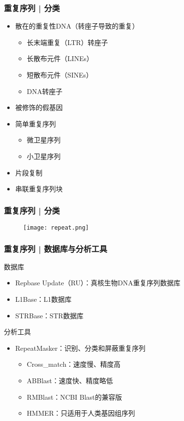 \begin{frame}
  \frametitle{重复序列 | 分类}
  \begin{itemize}
    \item 散在的重复性DNA（转座子导致的重复）
      \begin{itemize}
	\item 长末端重复（LTR）转座子
	\item 长散布元件（LINEs）
	\item 短散布元件（SINEs）
	\item DNA转座子
      \end{itemize}
    \item 被修饰的假基因
    \item 简单重复序列
      \begin{itemize}
	\item 微卫星序列
	\item 小卫星序列
      \end{itemize}
    \item 片段复制
    \item 串联重复序列块
  \end{itemize}
\end{frame}

\begin{frame}
  \frametitle{重复序列 | 分类}
  \begin{figure}
    \centering
    \texttt{[image: repeat.png]}
  \end{figure}
\end{frame}

\begin{frame}
  \frametitle{重复序列 | 数据库与分析工具}
  \begin{block}{数据库}
  \begin{itemize}
    \item Repbase Update（RU）：真核生物DNA重复序列数据库
    \item L1Base：L1数据库
    \item STRBase：STR数据库
  \end{itemize}
  \end{block}
  \pause
  \begin{block}{分析工具}
  \begin{itemize}
    \item RepeatMasker：识别、分类和屏蔽重复序列
      \begin{itemize}
        \item Cross\_match：速度慢、精度高
        \item ABBlast：速度快、精度略低
        \item RMBlast：NCBI Blast的兼容版
        \item HMMER：只适用于人类基因组序列
      \end{itemize}
  \end{itemize}
  \end{block}
\end{frame}

